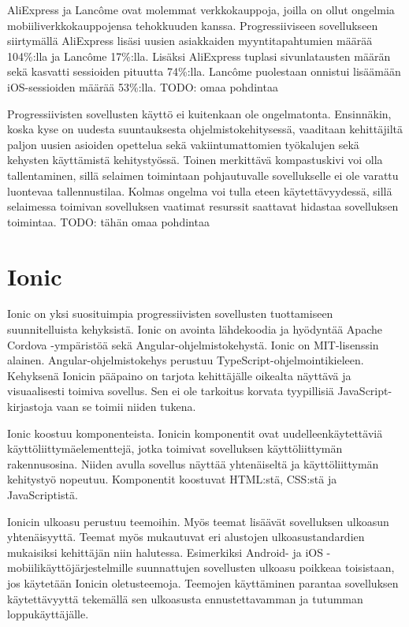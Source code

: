 \documentclass[utf8]{gradu3}
\begin{document}
AliExpress ja Lancôme ovat molemmat verkkokauppoja, joilla on ollut ongelmia mobiiliverkkokauppojensa tehokkuuden kanssa. Progressiiviseen sovellukseen siirtymällä AliExpress lisäsi uusien asiakkaiden myyntitapahtumien määrää 104\%:lla ja Lancôme 17\%:lla. Lisäksi AliExpress tuplasi sivunlatausten määrän sekä kasvatti sessioiden pituutta 74\%:lla. Lancôme puolestaan onnistui lisäämään iOS-sessioiden määrää 53\%:lla. \parencite[]{beginners-guide-pwa}  TODO: omaa pohdintaa

Progressiivisten sovellusten käyttö ei kuitenkaan ole ongelmatonta. Ensinnäkin, koska kyse on uudesta suuntauksesta ohjelmistokehitysessä, vaaditaan kehittäjiltä paljon uusien asioiden opettelua sekä vakiintumattomien työkalujen sekä kehysten käyttämistä kehitystyössä. Toinen merkittävä kompastuskivi voi olla tallentaminen, sillä selaimen toimintaan pohjautuvalle sovellukselle ei ole varattu luontevaa tallennustilaa. Kolmas ongelma voi tulla eteen käytettävyydessä, sillä selaimessa toimivan sovelluksen vaatimat resurssit saattavat hidastaa sovelluksen toimintaa. TODO: tähän omaa pohdintaa \parencite[]{pwa-design-challenges}

\section{Ionic}

Ionic on yksi suosituimpia progressiivisten sovellusten tuottamiseen suunnitelluista kehyksistä. Ionic on avointa lähdekoodia ja hyödyntää Apache Cordova -ympäristöä sekä Angular-ohjelmistokehystä. Ionic on MIT-lisenssin alainen. Angular-ohjelmistokehys perustuu TypeScript-ohjelmointikieleen. Kehyksenä Ionicin pääpaino on tarjota kehittäjälle oikealta näyttävä ja visuaalisesti toimiva sovellus. Sen ei ole tarkoitus korvata tyypillisiä JavaScript-kirjastoja vaan se toimii niiden tukena. \parencite[]{ionic-documentation}

Ionic koostuu komponenteista. Ionicin komponentit ovat uudelleenkäytettäviä käyttöliittymäelementtejä, jotka toimivat sovelluksen käyttöliittymän rakennusosina. Niiden avulla sovellus näyttää yhtenäiseltä ja käyttöliittymän kehitystyö nopeutuu. Komponentit koostuvat HTML:stä, CSS:stä ja JavaScriptistä.

Ionicin ulkoasu perustuu teemoihin. Myös teemat lisäävät sovelluksen ulkoasun yhtenäisyyttä. Teemat myös mukautuvat eri alustojen ulkoasustandardien mukaisiksi kehittäjän niin halutessa. Esimerkiksi Android- ja iOS -mobiilikäyttöjärjestelmille suunnattujen sovellusten ulkoasu poikkeaa toisistaan, jos käytetään Ionicin oletusteemoja. Teemojen käyttäminen parantaa sovelluksen käytettävyyttä tekemällä sen ulkoasusta ennustettavamman ja tutumman loppukäyttäjälle.
\end{document}
